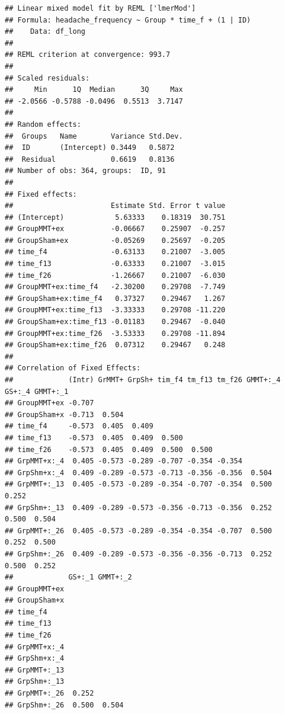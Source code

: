 \documentclass[
]{article}
\begin{document}
\begin{verbatim}
## Linear mixed model fit by REML ['lmerMod']
## Formula: headache_frequency ~ Group * time_f + (1 | ID)
##    Data: df_long
## 
## REML criterion at convergence: 993.7
## 
## Scaled residuals: 
##     Min      1Q  Median      3Q     Max 
## -2.0566 -0.5788 -0.0496  0.5513  3.7147 
## 
## Random effects:
##  Groups   Name        Variance Std.Dev.
##  ID       (Intercept) 0.3449   0.5872  
##  Residual             0.6619   0.8136  
## Number of obs: 364, groups:  ID, 91
## 
## Fixed effects:
##                       Estimate Std. Error t value
## (Intercept)            5.63333    0.18319  30.751
## GroupMMT+ex           -0.06667    0.25907  -0.257
## GroupSham+ex          -0.05269    0.25697  -0.205
## time_f4               -0.63133    0.21007  -3.005
## time_f13              -0.63333    0.21007  -3.015
## time_f26              -1.26667    0.21007  -6.030
## GroupMMT+ex:time_f4   -2.30200    0.29708  -7.749
## GroupSham+ex:time_f4   0.37327    0.29467   1.267
## GroupMMT+ex:time_f13  -3.33333    0.29708 -11.220
## GroupSham+ex:time_f13 -0.01183    0.29467  -0.040
## GroupMMT+ex:time_f26  -3.53333    0.29708 -11.894
## GroupSham+ex:time_f26  0.07312    0.29467   0.248
## 
## Correlation of Fixed Effects:
##             (Intr) GrMMT+ GrpSh+ tim_f4 tm_f13 tm_f26 GMMT+:_4 GS+:_4 GMMT+:_1
## GroupMMT+ex -0.707                                                            
## GroupSham+x -0.713  0.504                                                     
## time_f4     -0.573  0.405  0.409                                              
## time_f13    -0.573  0.405  0.409  0.500                                       
## time_f26    -0.573  0.405  0.409  0.500  0.500                                
## GrpMMT+x:_4  0.405 -0.573 -0.289 -0.707 -0.354 -0.354                         
## GrpShm+x:_4  0.409 -0.289 -0.573 -0.713 -0.356 -0.356  0.504                  
## GrpMMT+:_13  0.405 -0.573 -0.289 -0.354 -0.707 -0.354  0.500    0.252         
## GrpShm+:_13  0.409 -0.289 -0.573 -0.356 -0.713 -0.356  0.252    0.500  0.504  
## GrpMMT+:_26  0.405 -0.573 -0.289 -0.354 -0.354 -0.707  0.500    0.252  0.500  
## GrpShm+:_26  0.409 -0.289 -0.573 -0.356 -0.356 -0.713  0.252    0.500  0.252  
##             GS+:_1 GMMT+:_2
## GroupMMT+ex                
## GroupSham+x                
## time_f4                    
## time_f13                   
## time_f26                   
## GrpMMT+x:_4                
## GrpShm+x:_4                
## GrpMMT+:_13                
## GrpShm+:_13                
## GrpMMT+:_26  0.252         
## GrpShm+:_26  0.500  0.504
\end{verbatim}
\end{document}
